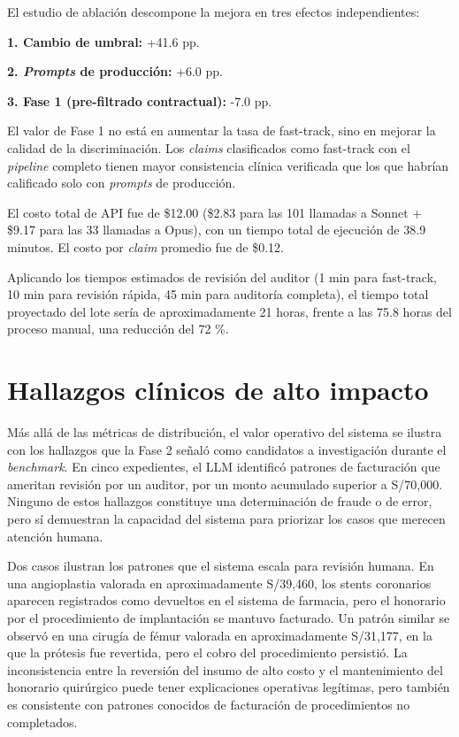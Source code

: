 El estudio de ablación descompone la mejora en tres efectos independientes:

\noindent \textbf{1. Cambio de umbral:} +41.6 pp.

\noindent \textbf{2. \textit{Prompts} de producción:} +6.0 pp.

\noindent \textbf{3. Fase 1 (pre-filtrado contractual):} -7.0 pp.

El valor de Fase 1 no está en aumentar la tasa de fast-track, sino en mejorar la calidad de la discriminación. Los \textit{claims} clasificados como fast-track con el \textit{pipeline} completo tienen mayor consistencia clínica verificada que los que habrían calificado solo con \textit{prompts} de producción.

El costo total de API fue de \$12.00 (\$2.83 para las 101 llamadas a Sonnet + \$9.17 para las 33 llamadas a Opus), con un tiempo total de ejecución de 38.9 minutos. El costo por \textit{claim} promedio fue de \$0.12.

Aplicando los tiempos estimados de revisión del auditor (1 min para fast-track, 10 min para revisión rápida, 45 min para auditoría completa), el tiempo total proyectado del lote sería de aproximadamente 21 horas, frente a las 75.8 horas del proceso manual, una reducción del 72 \%.

\section{Hallazgos clínicos de alto impacto}

Más allá de las métricas de distribución, el valor operativo del sistema se ilustra con los hallazgos que la Fase 2 señaló como candidatos a investigación durante el \textit{benchmark}. En cinco expedientes, el LLM identificó patrones de facturación que ameritan revisión por un auditor, por un monto acumulado superior a S/70,000. Ninguno de estos hallazgos constituye una determinación de fraude o de error, pero sí demuestran la capacidad del sistema para priorizar los casos que merecen atención humana.

Dos casos ilustran los patrones que el sistema escala para revisión humana. En una angioplastia valorada en aproximadamente S/39,460, los stents coronarios aparecen registrados como devueltos en el sistema de farmacia, pero el honorario por el procedimiento de implantación se mantuvo facturado. Un patrón similar se observó en una cirugía de fémur valorada en aproximadamente S/31,177, en la que la prótesis fue revertida, pero el cobro del procedimiento persistió. La inconsistencia entre la reversión del insumo de alto costo y el mantenimiento del honorario quirúrgico puede tener explicaciones operativas legítimas, pero también es consistente con patrones conocidos de facturación de procedimientos no completados.

